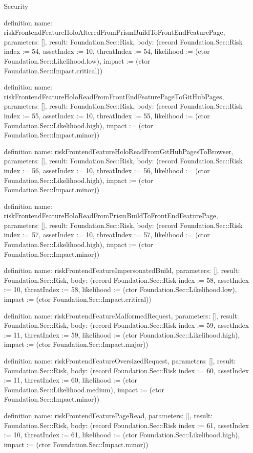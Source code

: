 \begin{lexlean}{Security}
\begin{semanticmodule}
definition{
  name: riskFrontendFeatureHoloAlteredFromPrismBuildToFrontEndFeaturePage,
  parameters: [],
  result: Foundation.Sec::Risk,
  body: (record Foundation.Sec::Risk {index := 54, assetIndex := 10, threatIndex := 54, likelihood := (ctor Foundation.Sec::Likelihood.low), impact := (ctor Foundation.Sec::Impact.critical)})
}

definition{
  name: riskFrontendFeatureHoloReadFromFrontEndFeaturePageToGitHubPages,
  parameters: [],
  result: Foundation.Sec::Risk,
  body: (record Foundation.Sec::Risk {index := 55, assetIndex := 10, threatIndex := 55, likelihood := (ctor Foundation.Sec::Likelihood.high), impact := (ctor Foundation.Sec::Impact.minor)})
}

definition{
  name: riskFrontendFeatureHoloReadFromGitHubPagesToBrowser,
  parameters: [],
  result: Foundation.Sec::Risk,
  body: (record Foundation.Sec::Risk {index := 56, assetIndex := 10, threatIndex := 56, likelihood := (ctor Foundation.Sec::Likelihood.high), impact := (ctor Foundation.Sec::Impact.minor)})
}

definition{
  name: riskFrontendFeatureHoloReadFromPrismBuildToFrontEndFeaturePage,
  parameters: [],
  result: Foundation.Sec::Risk,
  body: (record Foundation.Sec::Risk {index := 57, assetIndex := 10, threatIndex := 57, likelihood := (ctor Foundation.Sec::Likelihood.high), impact := (ctor Foundation.Sec::Impact.minor)})
}

definition{
  name: riskFrontendFeatureImpersonatedBuild,
  parameters: [],
  result: Foundation.Sec::Risk,
  body: (record Foundation.Sec::Risk {index := 58, assetIndex := 10, threatIndex := 58, likelihood := (ctor Foundation.Sec::Likelihood.low), impact := (ctor Foundation.Sec::Impact.critical)})
}

definition{
  name: riskFrontendFeatureMalformedRequest,
  parameters: [],
  result: Foundation.Sec::Risk,
  body: (record Foundation.Sec::Risk {index := 59, assetIndex := 11, threatIndex := 59, likelihood := (ctor Foundation.Sec::Likelihood.high), impact := (ctor Foundation.Sec::Impact.major)})
}

definition{
  name: riskFrontendFeatureOversizedRequest,
  parameters: [],
  result: Foundation.Sec::Risk,
  body: (record Foundation.Sec::Risk {index := 60, assetIndex := 11, threatIndex := 60, likelihood := (ctor Foundation.Sec::Likelihood.medium), impact := (ctor Foundation.Sec::Impact.minor)})
}

definition{
  name: riskFrontendFeaturePageRead,
  parameters: [],
  result: Foundation.Sec::Risk,
  body: (record Foundation.Sec::Risk {index := 61, assetIndex := 10, threatIndex := 61, likelihood := (ctor Foundation.Sec::Likelihood.high), impact := (ctor Foundation.Sec::Impact.minor)})
}


\end{semanticmodule}
\end{lexlean}

